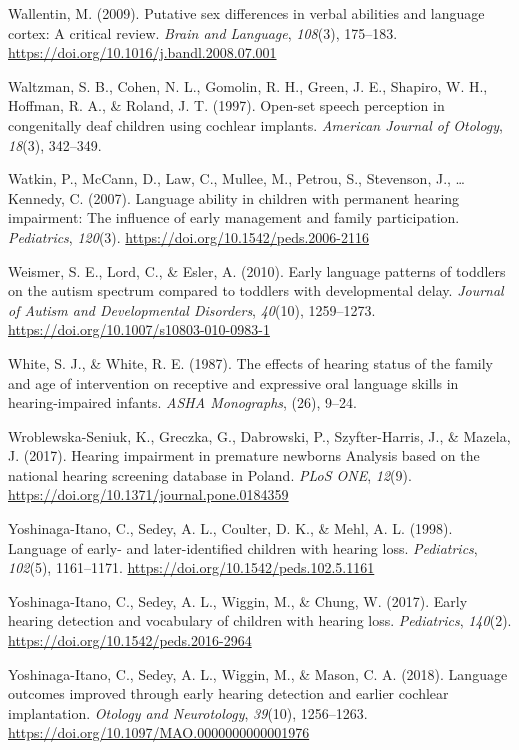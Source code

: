 \documentclass[english,man]{apa6}
\begin{document}
\leavevmode\hypertarget{ref-wallentin2009}{}%
Wallentin, M. (2009). Putative sex differences in verbal abilities and language cortex: A critical review. \emph{Brain and Language}, \emph{108}(3), 175--183. \url{https://doi.org/10.1016/j.bandl.2008.07.001}

\leavevmode\hypertarget{ref-waltzman1997}{}%
Waltzman, S. B., Cohen, N. L., Gomolin, R. H., Green, J. E., Shapiro, W. H., Hoffman, R. A., \& Roland, J. T. (1997). Open-set speech perception in congenitally deaf children using cochlear implants. \emph{American Journal of Otology}, \emph{18}(3), 342--349.

\leavevmode\hypertarget{ref-watkin2007}{}%
Watkin, P., McCann, D., Law, C., Mullee, M., Petrou, S., Stevenson, J., \ldots{} Kennedy, C. (2007). Language ability in children with permanent hearing impairment: The influence of early management and family participation. \emph{Pediatrics}, \emph{120}(3). \url{https://doi.org/10.1542/peds.2006-2116}

\leavevmode\hypertarget{ref-weismer2010}{}%
Weismer, S. E., Lord, C., \& Esler, A. (2010). Early language patterns of toddlers on the autism spectrum compared to toddlers with developmental delay. \emph{Journal of Autism and Developmental Disorders}, \emph{40}(10), 1259--1273. \url{https://doi.org/10.1007/s10803-010-0983-1}

\leavevmode\hypertarget{ref-white1987}{}%
White, S. J., \& White, R. E. (1987). The effects of hearing status of the family and age of intervention on receptive and expressive oral language skills in hearing-impaired infants. \emph{ASHA Monographs}, (26), 9--24.

\leavevmode\hypertarget{ref-wroblewska-seniuk2017}{}%
Wroblewska-Seniuk, K., Greczka, G., Dabrowski, P., Szyfter-Harris, J., \& Mazela, J. (2017). Hearing impairment in premature newborns Analysis based on the national hearing screening database in Poland. \emph{PLoS ONE}, \emph{12}(9). \url{https://doi.org/10.1371/journal.pone.0184359}

\leavevmode\hypertarget{ref-yoshinaga-itano1998}{}%
Yoshinaga-Itano, C., Sedey, A. L., Coulter, D. K., \& Mehl, A. L. (1998). Language of early- and later-identified children with hearing loss. \emph{Pediatrics}, \emph{102}(5), 1161--1171. \url{https://doi.org/10.1542/peds.102.5.1161}

\leavevmode\hypertarget{ref-yoshinaga-itano2017}{}%
Yoshinaga-Itano, C., Sedey, A. L., Wiggin, M., \& Chung, W. (2017). Early hearing detection and vocabulary of children with hearing loss. \emph{Pediatrics}, \emph{140}(2). \url{https://doi.org/10.1542/peds.2016-2964}

\leavevmode\hypertarget{ref-yoshinaga-itano2018}{}%
Yoshinaga-Itano, C., Sedey, A. L., Wiggin, M., \& Mason, C. A. (2018). Language outcomes improved through early hearing detection and earlier cochlear implantation. \emph{Otology and Neurotology}, \emph{39}(10), 1256--1263. \url{https://doi.org/10.1097/MAO.0000000000001976}
\end{document}
